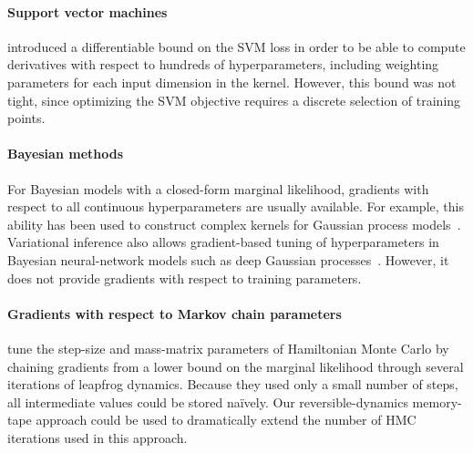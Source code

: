 \documentclass{article}
\begin{document}
\paragraph{Support vector machines}
\citet{chapelle2002choosing} 
 introduced a differentiable bound on the SVM loss in order to be able to compute derivatives with respect to hundreds of hyperparameters, including weighting parameters for each input dimension in the kernel.
However, this bound was not tight, since optimizing the SVM objective requires a discrete selection of training points.

\paragraph{Bayesian methods}
For Bayesian models with a closed-form marginal likelihood, gradients with respect to all continuous hyperparameters are usually available.
For example, this ability has been used to construct complex kernels for Gaussian process models~\citep[Chapter 5]{rasmussen38gaussian}.
Variational inference also allows gradient-based tuning of hyperparameters in Bayesian neural-network models such as deep Gaussian processes~\citep{deepGPVar14}.
However, it does not provide gradients with respect to training parameters.


\paragraph{Gradients with respect to Markov chain parameters}
\citet{Bridging14} tune the step-size and mass-matrix parameters of Hamiltonian Monte Carlo by chaining gradients from a lower bound on the marginal likelihood through several iterations of leapfrog dynamics.
Because they used only a small number of steps, all intermediate values could be stored na\"ively.
Our reversible-dynamics memory-tape approach could be used to dramatically extend the number of HMC iterations used in this approach.
\end{document}
